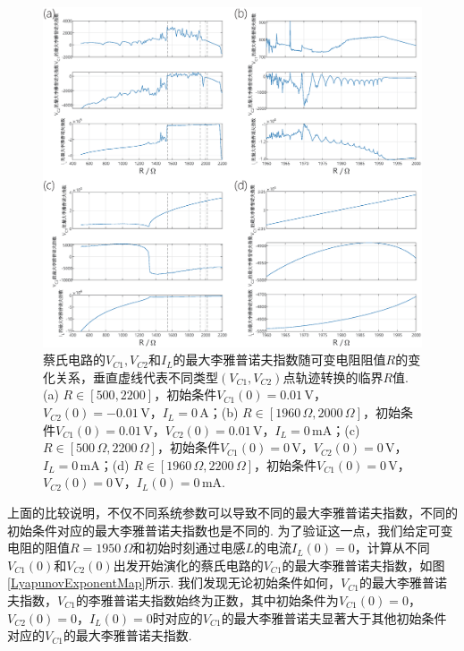 \documentclass[a4paper, 10pt]{article}
\begin{document}
\begin{multicols*}{2}
\begin{figure}[H]
    \centering
    \includegraphics[width=\columnwidth]{LyapunovExponent-R.eps}
    \caption{蔡氏电路的$V_{C1},V_{C2}$和$I_L$的最大李雅普诺夫指数随可变电阻阻值$R$的变化关系，垂直虚线代表不同类型$(V_{C1},V_{C2})$点轨迹转换的临界$R$值. (a) $R\in[500,2200]$，初始条件$V_{C1}(0)=0.01\,\mathrm{V}$，$V_{C2}(0)=-0.01\,\mathrm{V}$，$I_L=0\,\mathrm{A}$；(b) $R\in[1960\,\Omega,2000\,\Omega]$，初始条件$V_{C1}(0)=0.01\,\mathrm{V}$，$V_{C2}(0)=0.01\,\mathrm{V}$，$I_L=0\,\mathrm{mA}$；(c) $R\in[500\,\Omega,2200\,\Omega]$，初始条件$V_{C1}(0)=0\,\mathrm{V}$，$V_{C2}(0)=0\,\mathrm{V}$，$I_L=0\,\mathrm{mA}$；(d) $R\in[1960\,\Omega,2200\,\Omega]$，初始条件$V_{C1}(0)=0\,\mathrm{V}$，$V_{C2}(0)=0\,\mathrm{V}$，$I_L(0)=0\,\mathrm{mA}$.}
    \label{LyapunovExponent-R}
\end{figure}

上面的比较说明，不仅不同系统参数可以导致不同的最大李雅普诺夫指数，不同的初始条件对应的最大李雅普诺夫指数也是不同的. 为了验证这一点，我们给定可变电阻的阻值$R=1950\,\Omega$和初始时刻通过电感$L$的电流$I_L(0)=0$，计算从不同$V_{C1}(0)$和$V_{C2}(0)$出发开始演化的蔡氏电路的$V_{C1}$的最大李雅普诺夫指数，如图\ref{LyapunovExponentMap}所示. 我们发现无论初始条件如何，$V_{C1}$的最大李雅普诺夫指数，$V_{C1}$的李雅普诺夫指数始终为正数，其中初始条件为$V_{C1}(0)=0$，$V_{C2}(0)=0$，$I_L(0)=0$时对应的$V_{C1}$的最大李雅普诺夫显著大于其他初始条件对应的$V_{C1}$的最大李雅普诺夫指数.


\end{multicols*}
\end{document}
